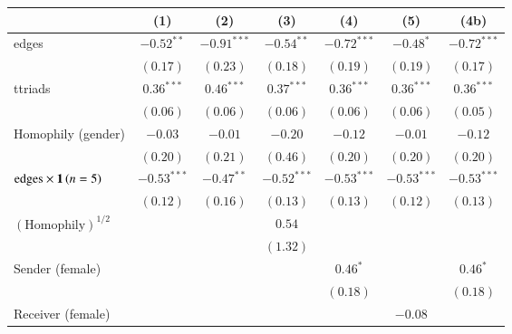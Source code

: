 
\begin{table}[tb]
\centering
\footnotesize
\begin{tabular}{l c c c c c c }
\toprule
 & (1) & (2) & (3) & (4) & (5) & (4b) \\
\midrule
edges                                     & $-0.52^{**}$  & $-0.91^{***}$ & $-0.54^{**}$  & $-0.72^{***}$ & $-0.48^{*}$   & $-0.72^{***}$ \\
                                          & $(0.17)$      & $(0.23)$      & $(0.18)$      & $(0.19)$      & $(0.19)$      & $(0.17)$      \\
ttriads                                   & $0.36^{***}$  & $0.46^{***}$  & $0.37^{***}$  & $0.36^{***}$  & $0.36^{***}$  & $0.36^{***}$  \\
                                          & $(0.06)$      & $(0.06)$      & $(0.06)$      & $(0.06)$      & $(0.06)$      & $(0.05)$      \\
Homophily (gender)                        & $-0.03$       & $-0.01$       & $-0.20$       & $-0.12$       & $-0.01$       & $-0.12$       \\
                                          & $(0.20)$      & $(0.21)$      & $(0.46)$      & $(0.20)$      & $(0.20)$      & $(0.20)$      \\
$\text{edges} \times {\boldsymbol{1}\left( n = 5 \right)}$       & $-0.53^{***}$ & $-0.47^{**}$  & $-0.52^{***}$ & $-0.53^{***}$ & $-0.53^{***}$ & $-0.53^{***}$ \\
                                          & $(0.12)$      & $(0.16)$      & $(0.13)$      & $(0.13)$      & $(0.12)$      & $(0.13)$      \\
$(\text{Homophily})^{1/2}$                &               &               & $0.54$        &               &               &               \\
                                          &               &               & $(1.32)$      &               &               &               \\
Sender (female)                           &               &               &               & $0.46^{*}$    &               & $0.46^{*}$    \\
                                          &               &               &               & $(0.18)$      &               & $(0.18)$      \\
Receiver (female)                           &               &               &               &               & $-0.08$       &               \\

\end{tabular}
\end{table}
